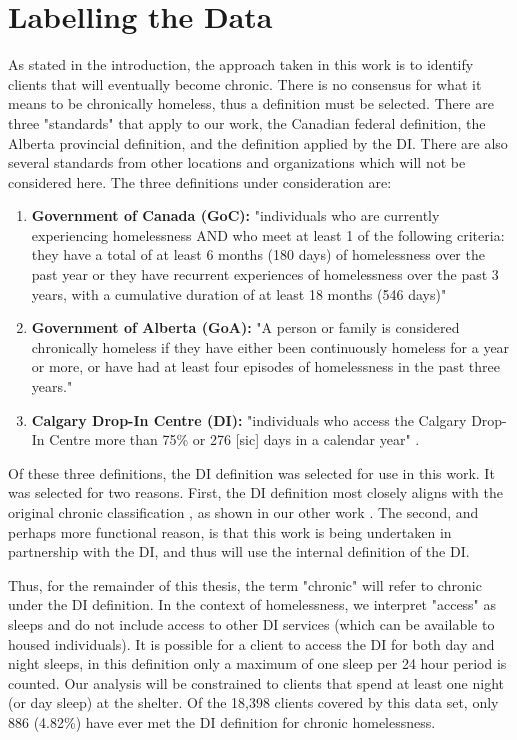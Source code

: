 \section{Labelling the Data} \label{chap:data:labelling}

As stated in the introduction, the approach taken in this work is to identify clients that will eventually become chronic. There is no consensus for what it means to be chronically homeless, thus a definition must be selected. There are three "standards" that apply to our work, the Canadian federal definition, the Alberta provincial definition, and the definition applied by the DI. There are also several standards \cite{byrne2015testing} from other locations and organizations which will not be considered here. The three definitions under consideration are:

\begin{enumerate}
\item \textbf{Government of Canada (GoC):} "individuals who are currently experiencing homelessness AND who meet at least 1 of the following criteria: they have a total of at least 6 months (180 days) of homelessness over the past year or they have recurrent experiences of homelessness over the past 3 years, with a cumulative duration of at least 18 months (546 days)" \cite{canada2020definition}
\item \textbf{Government of Alberta (GoA):} "A person or family is considered chronically homeless if they have either been continuously homeless for a year or more, or have had at least four episodes of homelessness in the past three years." \cite{snyder2008albertadefinition}
\item \textbf{Calgary Drop-In Centre (DI):} "individuals who access the Calgary Drop-In Centre more than 75\% or 276 [sic] days in a calendar year" \cite{di_2019}.
\end{enumerate}

Of these three definitions, the DI definition was selected for use in this work. It was selected for two reasons. First, the DI definition most closely aligns with the original chronic classification \cite{kuhn1998applying}, as shown in our other work \cite{messier2020}. The second, and perhaps more functional reason, is that this work is being undertaken in partnership with the DI, and thus will use the internal definition of the DI.

Thus, for the remainder of this thesis, the term "chronic" will refer to chronic under the DI definition. In the context of homelessness, we interpret "access" as sleeps and do not include access to other DI services (which can be available to housed individuals). It is possible for a client to access the DI for both day and night sleeps, in this definition only a maximum of one sleep per 24 hour period is counted. Our analysis will be constrained to clients that spend at least one night (or day sleep) at the shelter. Of the 18,398 clients covered by this data set, only 886 (4.82\%) have ever met the DI definition for chronic homelessness.

